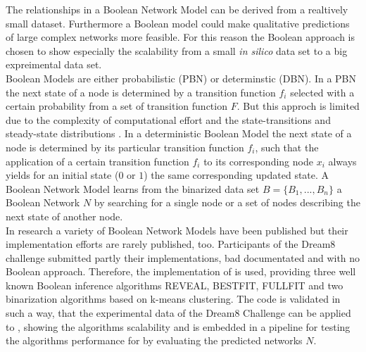  The relationships in a Boolean Network Model can be derived from a realtively small dataset. Furthermore a Boolean model could make qualitative predictions of large complex networks more feasible. For this reason the Boolean approach is chosen to show especially the scalability from a small \textit{in silico} data set to a big expreimental data set. \\
Boolean Models are either probabilistic (PBN) or determinstic (DBN). In a PBN the next state of a node is determined by a transition function $f_{i}$ selected with a certain probability from a set of transition function $F$. But this approch is limited due to the complexity of computational effort and the state-transitions and steady-state distributions 
. In a deterministic Boolean Model the next state of a node is determined by its particular transition function $f_{i}$, such that the application of a certain transition function $f_{i}$ to its corresponding node $x_{i}$ always yields for an initial state ($0$ or $1$) the same corresponding updated state.
A Boolean Network Model learns from the binarized data set $B=\{B_{1},...,B_{n}\}$ a Boolean Network $N$ by searching for a single node or a set of nodes describing the next state of another node.\\

In research a variety of Boolean Network Models have been published but their implementation efforts are rarely published, too. Participants of the Dream8 challenge submitted partly their implementations, bad documentated and with no Boolean approach. Therefore, the implementation of  %
 is used, providing three well known Boolean inference algorithms REVEAL, BESTFIT, FULLFIT and two binarization algorithms based on k-means clustering. The code is validated in such a way, that the experimental data of the Dream8 Challenge can be applied to , showing the algorithms scalability and is embedded in a pipeline for testing the algorithms performance for by evaluating the predicted networks $N$.


